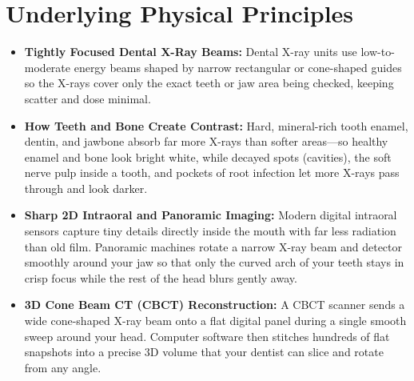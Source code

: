 \section{Underlying Physical Principles}
\begin{itemize}
\item \textbf{Tightly Focused Dental X-Ray Beams:} Dental X-ray units use low-to-moderate energy beams shaped by narrow rectangular or cone-shaped guides so the X-rays cover only the exact teeth or jaw area being checked, keeping scatter and dose minimal.
\item \textbf{How Teeth and Bone Create Contrast:} Hard, mineral-rich tooth enamel, dentin, and jawbone absorb far more X-rays than softer areas---so healthy enamel and bone look bright white, while decayed spots (cavities), the soft nerve pulp inside a tooth, and pockets of root infection let more X-rays pass through and look darker.
\item \textbf{Sharp 2D Intraoral and Panoramic Imaging:} Modern digital intraoral sensors capture tiny details directly inside the mouth with far less radiation than old film. Panoramic machines rotate a narrow X-ray beam and detector smoothly around your jaw so that only the curved arch of your teeth stays in crisp focus while the rest of the head blurs gently away.
\item \textbf{3D Cone Beam CT (CBCT) Reconstruction:} A CBCT scanner sends a wide cone-shaped X-ray beam onto a flat digital panel during a single smooth sweep around your head. Computer software then stitches hundreds of flat snapshots into a precise 3D volume that your dentist can slice and rotate from any angle.
\end{itemize}

